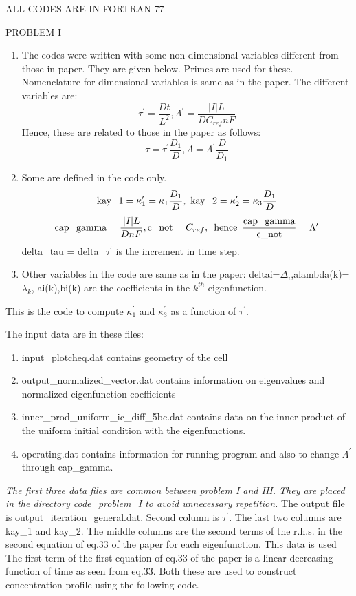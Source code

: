 \documentclass[a4paper,11pt]{article}
\begin{document}
\begin{center}
ALL CODES ARE IN FORTRAN 77
\end{center}
\begin{center}
  PROBLEM I
\end{center}
\begin{enumerate}
\item The codes were written with some non-dimensional variables different
  from those in paper. They are given below. Primes are used for these. Nomenclature for
  dimensional variables is same as in the paper.  The different variables are:
  \[\tau^\prime= \frac{D
    t}{L^2},\Lambda^\prime=\frac{|I|L}{DC_{ref}nF}\]
  Hence, these are related to those in the paper as follows:
  \[\tau=\tau^\prime\frac{D_1}{D}, \Lambda=\Lambda^\prime\frac{D}{D_1}\]
\item  
  Some are defined in the code only. 
  \[{\rm kay\_1}=\kappa_1^\prime=\kappa_1\frac{D_1}{D},\,\, {\rm kay\_2}=\kappa_2^\prime=\kappa_3\frac{D_1}{D}\]
  \[{\rm cap\_gamma}=\frac{|I|L}{DnF}, {\rm c\_not}=C_{ref},\,\,\,{\rm
    hence}\,\,\,\frac{\rm cap\_gamma}{\rm c\_not} = \Lambda^\prime\]
  delta\_tau = delta\_$\tau^\prime$ is the increment in time step.
\item Other variables in the code are same as in the paper:
  deltai=$\Delta_i$,alambda(k)=$\lambda_k$, ai(k),bi(k) are the
  coefficients in the $k^{th}$ eigenfunction. 
\end{enumerate}
\vspace{.1in}


This is the code to compute $\kappa_1^\prime$ and $\kappa_3^\prime$
as a function of $\tau^\prime$. 

The input data are in these files:
\begin{enumerate}
  \item input\_plotcheq.dat contains geometry of the cell
  \item  output\_normalized\_vector.dat contains information
    on eigenvalues and normalized  eigenfunction coefficients
\item inner\_prod\_uniform\_ic\_diff\_5bc.dat contains data on the
  inner product of the uniform initial condition with the
  eigenfunctions.
\item operating.dat contains information for running program and
    also to change $\Lambda^\prime$ through cap\_gamma.
\end{enumerate}
{\it The first three data files are common between problem I and
  III. They are placed in the directory code\_problem\_I to avoid
  unnecessary repetition.}
The output file is output\_iteration\_general.dat. Second column is
$\tau^\prime$. The last two columns are kay\_1 and kay\_2. The middle
columns are the second terms of the r.h.s. in the second
equation of eq.33 of the paper for each eigenfunction. This data is used 
The first term of the first equation of eq.33 of the paper is a linear
decreasing function of time as seen from eq.33. Both these are used to
construct concentration profile using the following code. 
\end{document}
